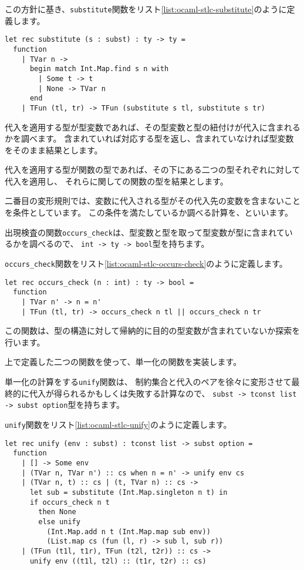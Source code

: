 この方針に基き、\texttt{substitute}関数をリスト\ref{list:ocaml-stlc-substitute}のように定義します。

\begin{lstlisting}[caption=代入, label=list:ocaml-stlc-substitute]
let rec substitute (s : subst) : ty -> ty =
  function
    | TVar n ->
      begin match Int.Map.find s n with
        | Some t -> t
        | None -> TVar n
      end
    | TFun (tl, tr) -> TFun (substitute s tl, substitute s tr)
\end{lstlisting}

代入を適用する型が型変数であれば、その型変数と型の紐付けが代入に含まれるかを調べます。
含まれていれば対応する型を返し、含まれていなければ型変数をそのまま結果とします。

代入を適用する型が関数の型であれば、その下にある二つの型それぞれに対して代入を適用し、
それらに関しての関数の型を結果とします。

二番目の変形規則では、変数に代入される型がその代入先の変数を含まないことを条件としています。
この条件を満たしているか調べる計算を、といいます。

出現検査の関数\texttt{occurs\_check}は、型変数と型を取って型変数が型に含まれているかを調べるので、
\texttt{int -> ty -> bool}型を持ちます。

\texttt{occurs\_check}関数をリスト\ref{list:ocaml-stlc-occurs-check}のように定義します。

\begin{lstlisting}[caption=出現検査, label=list:ocaml-stlc-occurs-check]
let rec occurs_check (n : int) : ty -> bool =
  function
    | TVar n' -> n = n'
    | TFun (tl, tr) -> occurs_check n tl || occurs_check n tr
\end{lstlisting}

この関数は、型の構造に対して帰納的に目的の型変数が含まれていないか探索を行います。

上で定義した二つの関数を使って、単一化の関数を実装します。

単一化の計算をする\texttt{unify}関数は、
制約集合と代入のペアを徐々に変形させて最終的に代入が得られるかもしくは失敗する計算なので、
\texttt{subst -> tconst list -> subst option}型を持ちます。

\texttt{unify}関数をリスト\ref{list:ocaml-stlc-unify}のように定義します。

\begin{lstlisting}[caption=単一化, label=list:ocaml-stlc-unify]
let rec unify (env : subst) : tconst list -> subst option =
  function
    | [] -> Some env
    | (TVar n, TVar n') :: cs when n = n' -> unify env cs
    | (TVar n, t) :: cs | (t, TVar n) :: cs ->
      let sub = substitute (Int.Map.singleton n t) in
      if occurs_check n t
        then None
        else unify
          (Int.Map.add n t (Int.Map.map sub env))
          (List.map cs (fun (l, r) -> sub l, sub r))
    | (TFun (t1l, t1r), TFun (t2l, t2r)) :: cs ->
      unify env ((t1l, t2l) :: (t1r, t2r) :: cs)
\end{lstlisting}

